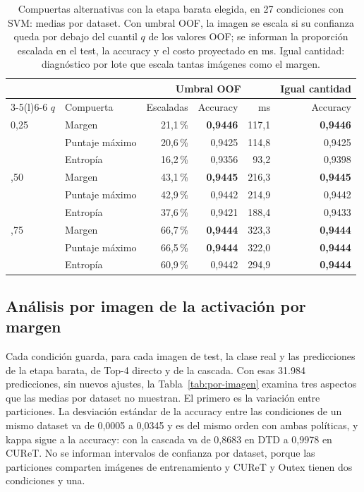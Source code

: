 \documentclass[a4paper,fleqn]{cas-sc}
\begin{document}
\begin{table}[pos=htbp]
\centering
\caption{Compuertas alternativas con la etapa barata elegida, en 27 condiciones con SVM: medias por dataset. Con umbral OOF, la imagen se escala si su confianza queda por debajo del cuantil $q$ de los valores OOF; se informan la proporción escalada en el test, la accuracy y el costo proyectado en ms. Igual cantidad: diagnóstico por lote que escala tantas imágenes como el margen.}
\label{tab:compuertas}
\small
\begin{tabular}{@{}llrrrr@{}}
\toprule
 & & \multicolumn{3}{c}{Umbral OOF} & Igual cantidad \\
\cmidrule(lr){3-5}\cmidrule(l){6-6}
$q$ & Compuerta & Escaladas & Accuracy & ms & Accuracy \\
\midrule
0,25 & Margen & 21,1\,\% & \textbf{0,9446} & 117,1 & \textbf{0,9446} \\
 & Puntaje máximo & 20,6\,\% & 0,9425 & 114,8 & 0,9425 \\
 & Entropía & 16,2\,\% & 0,9356 & 93,2 & 0,9398 \\
\addlinespace
0,50 & Margen & 43,1\,\% & \textbf{0,9445} & 216,3 & \textbf{0,9445} \\
 & Puntaje máximo & 42,9\,\% & 0,9442 & 214,9 & 0,9442 \\
 & Entropía & 37,6\,\% & 0,9421 & 188,4 & 0,9433 \\
\addlinespace
0,75 & Margen & 66,7\,\% & \textbf{0,9444} & 323,3 & \textbf{0,9444} \\
 & Puntaje máximo & 66,5\,\% & \textbf{0,9444} & 322,0 & \textbf{0,9444} \\
 & Entropía & 60,9\,\% & 0,9442 & 294,9 & \textbf{0,9444} \\
\bottomrule
\end{tabular}
\end{table}
\FloatBarrier

\subsection{Análisis por imagen de la activación por margen}\label{sec:por-imagen}

Cada condición guarda, para cada imagen de test, la clase real y las predicciones de la etapa barata, de Top-4 directo y de la cascada. Con esas 31.984 predicciones, sin nuevos ajustes, la Tabla~\ref{tab:por-imagen} examina tres aspectos que las medias por dataset no muestran. El primero es la variación entre particiones. La desviación estándar de la accuracy entre las condiciones de un mismo dataset va de 0,0005 a 0,0345 y es del mismo orden con ambas políticas, y kappa sigue a la accuracy: con la cascada va de 0,8683 en DTD a 0,9978 en CUReT. No se informan intervalos de confianza por dataset, porque las particiones comparten imágenes de entrenamiento y CUReT y Outex tienen dos condiciones y una.
\end{document}

